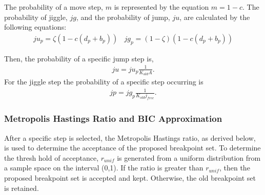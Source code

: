 \documentclass[submit]{smj}
\begin{document}
The probability of a move step, $m$ is represented by the equation $m = 1-c$. The probability of jiggle, $jg$, and the probability of jump, $ju$, are calculated by the following equations: 
\begin{align*}
ju_p =\zeta (1-  c(d_p + b_p))  \ \ \ \ jg_p =(1-\zeta)(1-c(d_p + b_p)) 
\end{align*}

Then, the probability of a specific jump step is,
\begin{align*}
ju =ju_p \frac{1}{K_{old} A}.  
\end{align*}
For the jiggle step the probability of a specific step occurring is
\begin{align*}
jp= jg_p  \frac{1}{K_{old} j_{free}}.
\end{align*}

\subsubsection{Metropolis Hastings Ratio and BIC Approximation} 
After a specific step is selected, the Metropolis Hastings ratio, as derived below, is used to determine the acceptance of the proposed breakpoint set. To determine the thresh hold of acceptance,  $r_{unif}$ is generated from a uniform distribution from a sample space on the interval (0,1). If the ratio is greater than $r_{unif}$, then the proposed breakpoint set is accepted and kept. Otherwise, the old breakpoint set is retained. 
\end{document}
